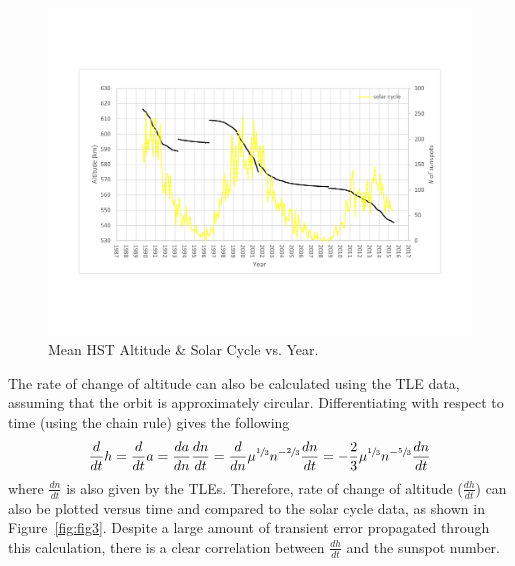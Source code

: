 \documentclass[paper=letter, fontsize=11pt]{scrartcl} %
\numberwithin{equation}{section} %
\numberwithin{figure}{section} %
\numberwithin{table}{section} %
\begin{document}
\begin{figure}[H]
    \begin{center}
        \includegraphics[width=1\textwidth]{figs2/2.pdf}
        \caption{Mean HST Altitude \& Solar Cycle vs. Year.}
        \label{fig:fig2}
    \end{center}
\end{figure}

The rate of change of altitude can also be calculated using the TLE data, assuming that the orbit is approximately circular. Differentiating with respect to time (using the chain rule) gives the following
\begin{align*}
    \dfrac{d}{dt} h = \dfrac{d}{dt} a = \dfrac{da}{dn} \dfrac{dn}{dt} = \dfrac{d}{dn} \mu^{\sfrac{1}{3}} n^{-\sfrac{2}{3}} \dfrac{dn}{dt} = -\dfrac{2}{3} \mu^{\sfrac{1}{3}} n^{-\sfrac{5}{3}} \dfrac{dn}{dt}
\end{align*}
where $\frac{dn}{dt}$ is also given by the TLEs. Therefore, rate of change of altitude ($\frac{dh}{dt}$) can also be plotted versus time and compared to the solar cycle data, as shown in Figure~\ref{fig:fig3}. Despite a large amount of transient error propagated through this calculation, there is a clear correlation between $\frac{dh}{dt}$ and the sunspot number.
\end{document}
